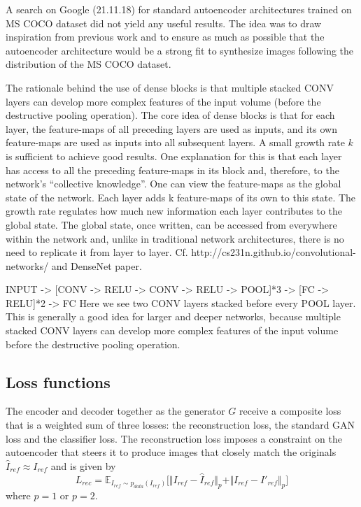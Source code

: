 \documentclass[11pt,a4paper]{article}
\begin{document}
\par A search on Google (21.11.18) for standard autoencoder architectures trained on MS COCO dataset did not yield any useful results. The idea was to draw inspiration from previous work and to ensure as much as possible that the autoencoder architecture would be a strong fit to synthesize images following the distribution of the MS COCO dataset.

\par The rationale behind the use of dense blocks is that multiple stacked CONV layers can develop more complex features of the input volume (before the destructive pooling operation). The core idea of dense blocks is that for each layer, the feature-maps of all preceding layers are used as inputs, and its own feature-maps are used as inputs into all subsequent layers. A small growth rate $k$ is sufficient to achieve good results. One explanation for this is that each layer has access to all the preceding feature-maps in its block and, therefore, to the network’s “collective knowledge”. One can view the feature-maps as the global state of the network. Each layer adds k feature-maps of its own to this state. The growth
rate regulates how much new information each layer contributes to the global state. The global state, once written, can be accessed from everywhere within the network and, unlike in traditional network architectures, there is no need to replicate it from layer to layer.
Cf. http://cs231n.github.io/convolutional-networks/ and DenseNet paper.

\par INPUT -> [CONV -> RELU -> CONV -> RELU -> POOL]*3 -> [FC -> RELU]*2 -> FC
Here we see two CONV layers stacked before every POOL layer. This is generally a good
idea for larger and deeper networks, because multiple stacked CONV layers can develop
more complex features of the input volume before the destructive pooling operation.

\subsection{Loss functions}
The encoder and decoder together as the generator $G$ receive a composite loss that is a weighted sum of three losses: the reconstruction loss, the standard GAN loss and the classifier loss. The reconstruction loss imposes a constraint on the autoencoder that steers it to produce images that closely match the originals $\hat{I}_{ref} \approx I_{ref}$ and is given by
\begin{equation} \label{eq:4}
    L_{rec} = \mathbb{E}_{I_{ref}\sim p_{data} (I_{ref})}\big[ \Vert I_{ref} - \hat{I}_{ref} \Vert_p + \Vert I_{ref} - I'_{ref} \Vert_p \big]
\end{equation}
where $p = 1$ or $p = 2$.
\end{document}
